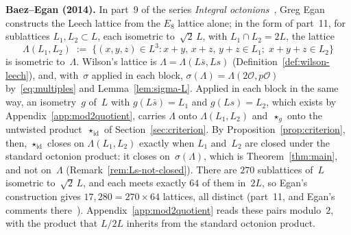 \documentclass[twoside,english]{paper}
\numberwithin{equation}{section}
\numberwithin{figure}{section}
\theoremstyle{definition}
\theoremstyle{remark}
\newcommand{\MO}{\mathcal{O}}         %
\newcommand{\LL}{\Lambda}             %
\begin{document}
\textbf{Baez--Egan (2014).}  In part~9 of the series \emph{Integral
octonions}~\cite{Baez2014}, Greg Egan constructs the Leech lattice from
the $E_8$ lattice alone; in the form of part~11, for sublattices
$L_1, L_2 \subset L$, each isometric to~$\sqrt{2}\,L$, with
$L_1 \cap L_2 = 2L$, the lattice
\begin{equation}\label{eq:egan}
  \LL(L_1, L_2) \;:=\; \bigl\{ (x,y,z) \in L^3 :
    x{+}y,\, x{+}z,\, y{+}z \in L_1;\; x{+}y{+}z \in L_2 \bigr\}
\end{equation}
is isometric to~$\LL$.  Wilson's lattice is $\LL = \LL(L\bar s, Ls)$
(Definition~\ref{def:wilson-leech}), and, with~$\sigma$ applied in each
block, $\sigma(\LL) = \LL(2\MO, p\MO)$ by~\eqref{eq:multiples} and
Lemma~\ref{lem:sigma-L}.  Applied in each block in the same way, an
isometry~$g$ of~$L$ with $g(L\bar s) = L_1$ and $g(Ls) = L_2$, which
exists by Appendix~\ref{app:mod2quotient}, carries $\LL$ onto
$\LL(L_1, L_2)$ and~$\star_g$ onto the untwisted product~$\star_{\mathrm{id}}$
of Section~\ref{sec:criterion}.  By Proposition~\ref{prop:criterion}, then,
$\star_{\mathrm{id}}$ closes on $\LL(L_1, L_2)$ exactly when $L_1$
and~$L_2$ are closed under the standard octonion product: it closes
on~$\sigma(\LL)$, which is Theorem~\ref{thm:main}, and not on~$\LL$
(Remark~\ref{rem:Ls-not-closed}).  There are $270$ sublattices of~$L$
isometric to~$\sqrt{2}\,L$, and each meets exactly $64$ of them in~$2L$,
so Egan's construction gives $17{,}280 = 270 \times 64$ lattices, all
distinct (part~11, and Egan's comments there~\cite{Egan2014}).
Appendix~\ref{app:mod2quotient} reads these pairs modulo~$2$, with the
product that $L/2L$ inherits from the standard octonion product.
\end{document}
